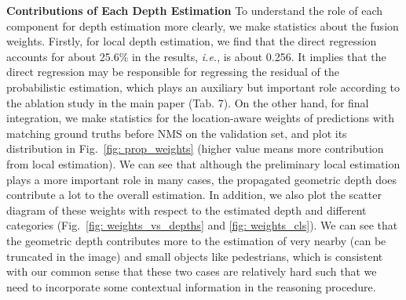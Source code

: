 \noindent\textbf{Contributions of Each Depth Estimation}\label{sec: quant_depth}\quad
To understand the role of each component for depth estimation more clearly, we make statistics about the fusion weights. Firstly, for local depth estimation, we find that the direct regression accounts for about 25.6\% in the results, \emph{i.e.},  is about 0.256. It implies that the direct regression may be responsible for regressing the residual of the probabilistic estimation, which plays an auxiliary but important role according to the ablation study in the main paper (Tab. 7). On the other hand, for final integration, we make statistics for the location-aware weights  of predictions with matching ground truths before NMS on the validation set, and plot its distribution in Fig.~\ref{fig: prop_weights} (higher value means more contribution from local estimation). We can see that although the preliminary local estimation plays a more important role in many cases, the propagated geometric depth does contribute a lot to the overall estimation. In addition, we also plot the scatter diagram of these weights with respect to the estimated depth and different categories (Fig.~\ref{fig: weights_vs_depths} and \ref{fig: weights_cls}). We can see that the geometric depth contributes more to the estimation of very nearby (can be truncated in the image) and small objects like pedestrians, which is consistent with our common sense that these two cases are relatively hard such that we need to incorporate some contextual information in the reasoning procedure.


